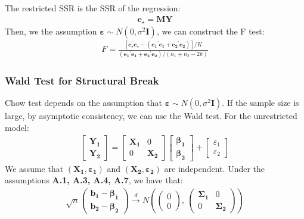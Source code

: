 \documentclass{article}
\begin{document}
The restricted SSR is the SSR of the regression:
	\begin{align*}
		\boldsymbol{e}_\star = \boldsymbol{M}\boldsymbol{Y}
	\end{align*}
Then, we the assumption $\boldsymbol{\varepsilon} \sim N(0, \sigma^2 \boldsymbol{I})$, we can construct the F test:
	\begin{align*}
		F = \frac{[\boldsymbol{e}^\prime_\star \boldsymbol{e}_\star - (\boldsymbol{e_1}^\prime \boldsymbol{e_1} + \boldsymbol{e_2}^\prime \boldsymbol{e_2})] / K}{(\boldsymbol{e_1}^\prime \boldsymbol{e_1} + \boldsymbol{e_2}^\prime \boldsymbol{e_2}) / (n_1 + n_2 - 2k)}
	\end{align*}

\subsubsection{Wald Test for Structural Break}
Chow test depends on the assumption that $\boldsymbol{\varepsilon} \sim N(0, \sigma^2 \boldsymbol{I})$. If the sample size is large, by asymptotic consistency, we can use the Wald test. For the unrestricted model: 
	\begin{align*}
		\begin{bmatrix}
			\boldsymbol{Y_1}\\
			\boldsymbol{Y_2}
		\end{bmatrix} = 
		\begin{bmatrix}
			\boldsymbol{X_1} & 0\\
			0 & \boldsymbol{X_2}
		\end{bmatrix}
		\begin{bmatrix}
			\boldsymbol{\beta_1}\\
			\boldsymbol{\beta_2}
		\end{bmatrix} + 
		\begin{bmatrix}
			\varepsilon_1\\
			\varepsilon_2
		\end{bmatrix}
	\end{align*}
We assume that $(\boldsymbol{X_1}, \boldsymbol{\varepsilon_1})$ and $(\boldsymbol{X_2}, \boldsymbol{\varepsilon_2})$ are independent. Under the assumptions \textbf{A.1, A.3, A.4, A.7}, we have that:
	\begin{align*}
		\sqrt{n} 
		\begin{pmatrix}
			\boldsymbol{b_1} - \boldsymbol{\beta_1}\\
			\boldsymbol{b_2} - \boldsymbol{\beta_2}
		\end{pmatrix} \xrightarrow{d} N \left(
		\begin{pmatrix}
			0\\
			0
		\end{pmatrix},\
		\begin{pmatrix}
			\boldsymbol{\Sigma_1} & 0\\
			0 & \boldsymbol{\Sigma_2}
		\end{pmatrix} \right)
	\end{align*}
\end{document}
